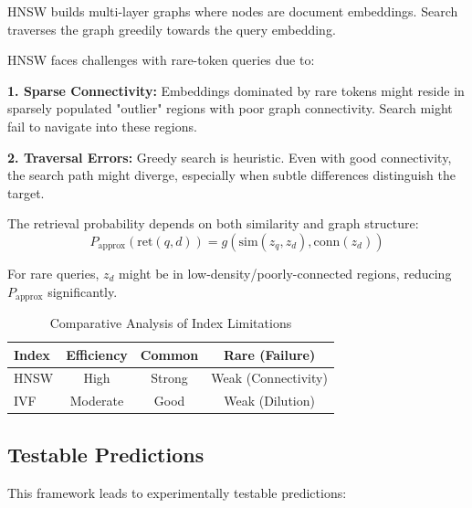 \documentclass[conference,anonymous]{IEEEtran}
\begin{document}
HNSW \cite{malkov2019efficient} builds multi-layer graphs where nodes are document embeddings. Search traverses the graph greedily towards the query embedding.

HNSW faces challenges with rare-token queries due to:

\textbf{1. Sparse Connectivity:} Embeddings dominated by rare tokens might reside in sparsely populated "outlier" regions with poor graph connectivity. Search might fail to navigate into these regions.

\textbf{2. Traversal Errors:} Greedy search is heuristic. Even with good connectivity, the search path might diverge, especially when subtle differences distinguish the target.

The retrieval probability depends on both similarity and graph structure:
\begin{equation}
P_{\text{approx}}(\text{ret}(q, d)) = g(\text{sim}(z_q, z_d), \text{conn}(z_d))
\label{eq:hnsw_retrieval_prob}
\end{equation}

For rare queries, $z_d$ might be in low-density/poorly-connected regions, reducing $P_{\text{approx}}$ significantly.

\begin{table}[t]
\centering
\small
\caption{Comparative Analysis of Index Limitations}
\label{tab:comparison_revised}
\begin{tabular}{lccc}
\toprule
\textbf{Index} & \textbf{Efficiency} & \textbf{Common} & \textbf{Rare (Failure)} \\
\midrule
HNSW & High & Strong & Weak (Connectivity) \\
IVF & Moderate & Good & Weak (Dilution) \\
\bottomrule
\end{tabular}
\end{table}

\subsection{Testable Predictions}

This framework leads to experimentally testable predictions:
\end{document}
